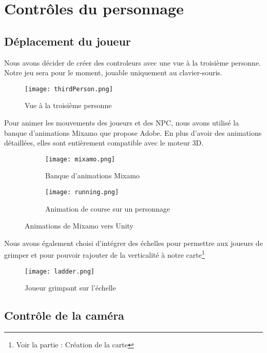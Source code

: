 \documentclass[../doc.tex]{subfiles}
\begin{document}
    \section{Contrôles du personnage}
        \subsection{Déplacement du joueur}
            Nous avons décider de créer des controleurs avec une vue à la troisième personne.
            Notre jeu sera pour le moment, jouable uniquement au clavier-souris.
            \begin{figure}[hbt!]
                \centering
                \texttt{[image: thirdPerson.png]}
                \caption{Vue à la troisième personne}
            \end{figure}
            Pour animer les mouvements des joueurs et des NPC, nous avons utilisé la banque d'animations Mixamo que propose Adobe.
            En plus d'avoir des animations détaillées, elles sont entièrement compatible avec le moteur 3D.
            \begin{figure}[hbt!]
                \centering
                \begin{subfigure}[b]{0.3\textwidth}
                    \texttt{[image: mixamo.png]} 
                    \caption{Banque d'animations Mixamo}
                \end{subfigure}
                \hspace{150pt}
                \begin{subfigure}[b]{0.3\textwidth}
                    \texttt{[image: running.png]} 
                    \caption{Animation de course sur un personnage}
                \end{subfigure}
                \caption{Animations de Mixamo vers Unity}
            \end{figure}

            Nous avons également choisi d'intégrer des échelles pour permettre aux joueurs de grimper et pour pouvoir rajouter de la verticalité à notre carte\footnote{Voir la partie : Création de la carte}
            \begin{figure}[hbt!]
                \centering
                \texttt{[image: ladder.png]}
                \caption{Joueur grimpant sur l'échelle}
            \end{figure}
        \subsection{Contrôle de la caméra}
\end{document}
